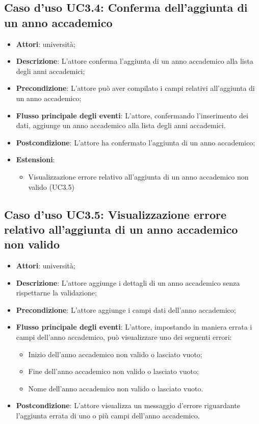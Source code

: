 \subsection{Caso d'uso \texorpdfstring{UC3.4}{UC3.4}: Conferma dell'aggiunta di un anno accademico}
\begin{itemize}
\item \textbf{Attori}: università;
\item \textbf{Descrizione}: L'attore conferma l'aggiunta di un anno accademico alla lista degli anni accademici;
\item \textbf{Precondizione}: L'attore può aver compilato i campi relativi all'aggiunta di un anno accademico;
\item \textbf{Flusso principale degli eventi}: L'attore, confermando l'inserimento dei dati, aggiunge un anno accademico alla lista degli anni accademici.
\item \textbf{Postcondizione}: L'attore ha confermato l'aggiunta di un anno accademico;
\item \textbf{Estensioni}:
\begin{itemize}
\item Visualizzazione errore relativo all'aggiunta di un anno accademico non valido (UC3.5)
\end{itemize}
\end{itemize}
\subsection{Caso d'uso \texorpdfstring{UC3.5}{UC3.5}: Visualizzazione errore relativo all'aggiunta di un anno accademico non valido}
\begin{itemize}
\item \textbf{Attori}: università;
\item \textbf{Descrizione}: L'attore aggiunge i dettagli di un anno accademico senza rispettarne la validazione;
\item \textbf{Precondizione}: L'attore aggiunge i campi dati dell'anno accademico;
\item \textbf{Flusso principale degli eventi}: L'attore, impostando in maniera errata i campi dell'anno accademico, può visualizzare uno dei seguenti errori:
\begin{itemize}
\item Inizio dell'anno accademico non valido o lasciato vuoto;
\item Fine dell'anno accademico non valido o lasciato vuoto;
\item Nome dell'anno accademico non valido o lasciato vuoto.
\end{itemize}
\item \textbf{Postcondizione}: L'attore visualizza un messaggio d'errore riguardante l'aggiunta errata di uno o più campi dell'anno accademico.
\end{itemize}
